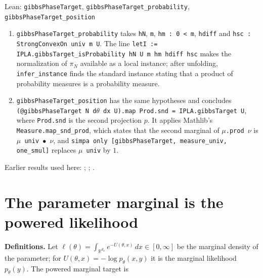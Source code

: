 \documentclass[11pt,a4paper]{article}
\begin{document}
\begin{leanbox}{Lean: \texttt{gibbsPhaseTarget}, \texttt{gibbsPhaseTarget\_\allowbreak{}probability}, \texttt{gibbsPhaseTarget\_\allowbreak{}position}}
\begin{enumerate}


\item \texttt{gibbs\allowbreak{}Phase\allowbreak{}Target\_\allowbreak{}probability} takes \texttt{h\allowbreak{}N}, \texttt{m}, \texttt{hm : 0 < m}, \texttt{hdiff} and \texttt{hsc : Strong\allowbreak{}Convex\allowbreak{}On univ m U}. The line \texttt{let\allowbreak{}I := IPLA.\allowbreak{}gibbs\allowbreak{}Target\_\allowbreak{}is\allowbreak{}Probability h\allowbreak{}N U m hm hdiff hsc} makes the normalization of \(\pi_N\) available as a local instance; after unfolding, \texttt{infer\_\allowbreak{}instance} finds the standard instance stating that a product of probability measures is a probability measure.

\item \texttt{gibbs\allowbreak{}Phase\allowbreak{}Target\_\allowbreak{}position} has the same hypotheses and concludes \texttt{(@gibbs\allowbreak{}Phase\allowbreak{}Target N d\ensuremath{\theta} dx U).\allowbreak{}map Prod.\allowbreak{}snd = IPLA.\allowbreak{}gibbs\allowbreak{}Target U}, where \texttt{Prod.\allowbreak{}snd} is the second projection \(p\). It applies Mathlib's \texttt{Measure.\allowbreak{}map\_\allowbreak{}snd\_\allowbreak{}prod}, which states that the second marginal of \texttt{\ensuremath{\mu}.\allowbreak{}prod \ensuremath{\nu}} is \texttt{\ensuremath{\mu} univ \ensuremath{\bullet} \ensuremath{\nu}}, and \texttt{simpa only [gibbs\allowbreak{}Phase\allowbreak{}Target, measure\_\allowbreak{}univ, one\_\allowbreak{}smul]} replaces \texttt{\ensuremath{\mu} univ} by \(1\).

\end{enumerate}
\end{leanbox}


Earlier results used here: \cite[Section~3.1.1]{LangevinLean2026IPLA}; \cite[Section~3.3.2]{LangevinLean2026IPLA}; \cite[Section~3.5.1]{LangevinLean2026IPLA}.

\section{\texorpdfstring{The parameter marginal is the powered likelihood}{The parameter marginal is the powered likelihood}}


\textbf{Definitions.} Let \(\ell(\theta)=\int_{\mathbb R^{d_x}}e^{-U(\theta,x)}\,dx\in[0,\infty]\) be the marginal density of the parameter; for \(U(\theta,x)=-\log p_\theta(x,y)\) it is the marginal likelihood \(p_\theta(y)\). The powered marginal target is
\end{document}
